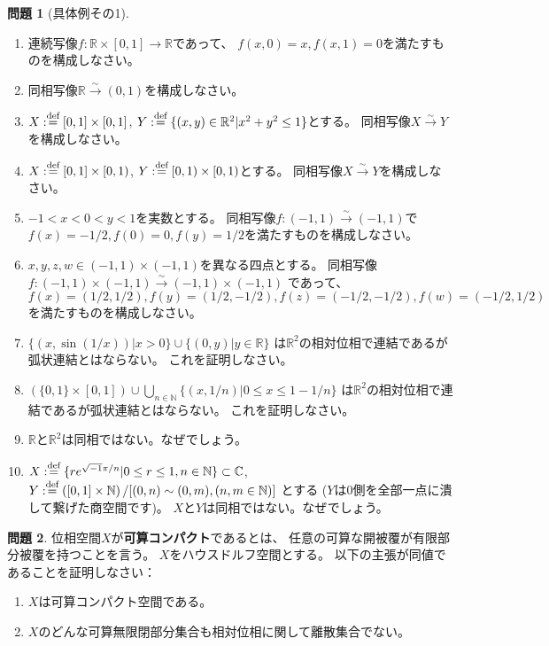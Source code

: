 \documentclass[uplatex]{jsarticle}
\theoremstyle{definition}
\newtheorem{prob}[prob]{問題}
\newcommand{\dfn}{:\overset{\mbox{{\scriptsize def}}}{=}}
\newcommand{\C}{\mathbb{C}}
\newcommand{\R}{\mathbb{R}}
\newcommand{\N}{\mathbb{N}}
\begin{document}
\begin{prob}[具体例その1]
  \
  \begin{enumerate}
    \item
    連続写像\(f:\R\times [0,1]\to \R\)であって、
    \(f(x,0) = x, f(x,1) = 0\)を満たすものを構成しなさい。
    \item
    同相写像\(\R \xrightarrow{\sim} (0,1)\)を構成しなさい。
    \item
    \(X\dfn [0,1]\times [0,1]\),
    \(Y\dfn \{(x,y)\in \R^2 | x^2+y^2 \leq 1\}\)とする。
    同相写像\(X \xrightarrow{\sim} Y\)を構成しなさい。
    \item
    \(X\dfn [0,1]\times [0,1)\),
    \(Y\dfn [0,1)\times [0,1)\)とする。
    同相写像\(X \xrightarrow{\sim} Y\)を構成しなさい。
    \item
    \(-1< x < 0 < y < 1\)を実数とする。
    同相写像\(f:(-1,1)\xrightarrow{\sim} (-1,1)\)で
    \(f(x) = -1/2, f(0) = 0, f(y) = 1/2\)を満たすものを構成しなさい。
    \item
    \(x,y,z,w\in (-1,1)\times (-1,1)\)を異なる四点とする。
    同相写像\(f:(-1,1)\times (-1,1)\xrightarrow{\sim} (-1,1) \times (-1,1)\)
    であって、\(f(x) = (1/2,1/2), f(y) = (1/2,-1/2), f(z) = (-1/2,-1/2), f(w) = (-1/2,1/2)\)
    を満たすものを構成しなさい。
    \item
    \(\{(x,\sin (1/x)) | x > 0\} \cup \{(0,y) | y\in \R\}\)
    は\(\R^2\)の相対位相で連結であるが弧状連結とはならない。
    これを証明しなさい。
    \item
    \((\{0,1\}\times [0,1])\cup \bigcup_{n\in \N}\{(x,1/n) | 0\leq x \leq 1-1/n\}\)
    は\(\R^2\)の相対位相で連結であるが弧状連結とはならない。
    これを証明しなさい。
    \item
    \(\R\)と\(\R^2\)は同相ではない。なぜでしょう。
    \item
    \(X \dfn \{re^{\sqrt{-1}\pi/n} | 0\leq r\leq 1, n\in \N\}\subset \C\),
    \(Y \dfn \left( [0,1]\times \N\right)/ [(0,n)\sim (0,m), (n,m\in \N)]\)
    とする (\(Y\)は\(0\)側を全部一点に潰して繋げた商空間です)。
    \(X\)と\(Y\)は同相ではない。なぜでしょう。
  \end{enumerate}
\end{prob}





\begin{prob}
  位相空間\(X\)が\textbf{可算コンパクト}であるとは、
  任意の可算な開被覆が有限部分被覆を持つことを言う。
  \(X\)をハウスドルフ空間とする。
  以下の主張が同値であることを証明しなさい：
  \begin{enumerate}
    \item
    \(X\)は可算コンパクト空間である。
    \item
    \(X\)のどんな可算無限閉部分集合も相対位相に関して離散集合でない。
  \end{enumerate}
\end{prob}
\end{document}
